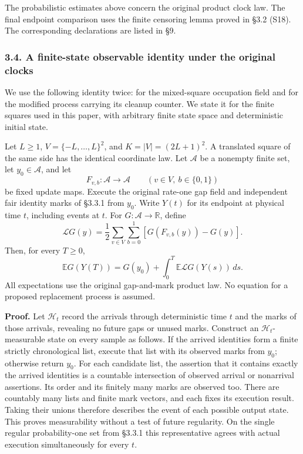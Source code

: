 \documentclass[
  11pt,
  a4paper,
]{article}
\begin{document}
The probabilistic estimates above concern the original product clock
law. The final endpoint comparison uses the finite censoring lemma
proved in §3.2 (S18). The corresponding declarations are listed in §9.

\subsubsection{3.4. A finite-state observable identity under the
original
clocks}\label{a-finite-state-observable-identity-under-the-original-clocks}

We use the following identity twice: for the mixed-square occupation
field and for the modified process carrying its cleanup counter. We
state it for the finite squares used in this paper, with arbitrary
finite state space and deterministic initial state.

Let \(L\geq1\), \(V=\{-L,\ldots,L\}^2\), and \(K=|V|=(2L+1)^2\). A
translated square of the same side has the identical coordinate law. Let
\(\mathcal A\) be a nonempty finite set, let \(y_0\in\mathcal A\), and
let \[
F_{v,b}:\mathcal A\longrightarrow\mathcal A
\qquad(v\in V,\ b\in\{0,1\})
\] be fixed update maps. Execute the original rate-one gap field and
independent fair identity marks of §3.3.1 from \(y_0\). Write \(Y(t)\)
for its endpoint at physical time \(t\), including events at \(t\). For
\(G:\mathcal A\to\mathbb R\), define \[
\mathcal LG(y)=\frac12\sum_{v\in V}\sum_{b=0}^1
  [G(F_{v,b}(y))-G(y)].
\tag{FM1}
\] Then, for every \(T\geq0\), \[
\mathbb E G(Y(T))=G(y_0)+\int_0^T\mathbb E\mathcal LG(Y(s))\,ds.
\tag{FM6}
\] All expectations use the original gap-and-mark product law. No
equation for a proposed replacement process is assumed.

\textbf{Proof.} Let \(\mathcal H_t\) record the arrivals through
deterministic time \(t\) and the marks of those arrivals, revealing no
future gaps or unused marks. Construct an \(\mathcal H_t\)-measurable
state on every sample as follows. If the arrived identities form a
finite strictly chronological list, execute that list with its observed
marks from \(y_0\); otherwise return \(y_0\). For each candidate list,
the assertion that it contains exactly the arrived identities is a
countable intersection of observed arrival or nonarrival assertions. Its
order and its finitely many marks are observed too. There are countably
many lists and finite mark vectors, and each fixes its execution result.
Taking their unions therefore describes the event of each possible
output state. This proves measurability without a test of future
regularity. On the single regular probability-one set from §3.3.1 this
representative agrees with actual execution simultaneously for every
\(t\).
\end{document}
